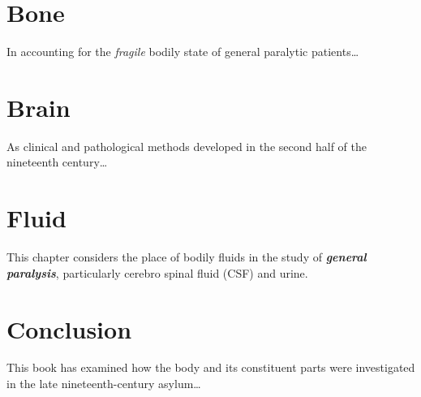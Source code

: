 \documentclass[
  openany]{book}
\begin{document}
\hypertarget{bone}{%
\chapter{Bone}\label{bone}}

In accounting for the \emph{fragile} bodily state of general paralytic patients\ldots{}

\hypertarget{brain}{%
\chapter{Brain}\label{brain}}

As clinical and pathological methods developed in the second half of the nineteenth century\ldots{}

\hypertarget{fluid}{%
\chapter{Fluid}\label{fluid}}

This chapter considers the place of bodily fluids in the study of \textbf{\emph{general paralysis}}, particularly cerebro spinal fluid (CSF) and urine.

\hypertarget{conclusion}{%
\chapter{Conclusion}\label{conclusion}}

This book has examined how the body and its constituent parts were investigated in the late nineteenth-century asylum\ldots{}
\end{document}
